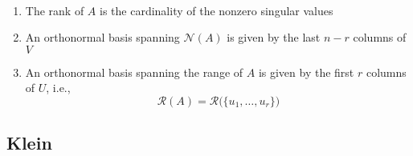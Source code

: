 \documentclass[a4paper,10pt]{article}  %
\begin{document}
\begin{claim} \ \\[-1.5\baselineskip]
   \begin{enumerate}
      \item The rank of $ A $ is the cardinality of the nonzero singular values
      \item An orthonormal basis spanning $ \mathcal{N}(A) $ is given by the last $ n-r $ columns of $ V $
      \item An orthonormal basis spanning the range of $ A $ is given by the first $ r $ columns of $ U $, i.e., 
      \[
         \mathcal{R}(A) = \mathcal{R} \big(  \{ u_1, \ldots, u_r \}  \big)
      \]
   \end{enumerate}
\end{claim}



\subsection{Klein} %
\label{sub:klein}
\end{document}
